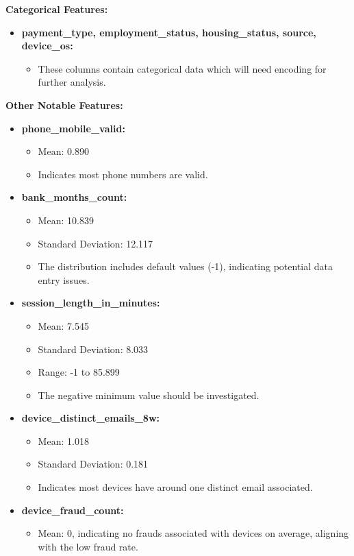 \documentclass[12pt,a4paper]{report}
\begin{document}
\textbf{Categorical Features:}
\begin{itemize}
    \item \textbf{payment\_type, employment\_status, housing\_status, source, device\_os:}
        \begin{itemize}
            \item These columns contain categorical data which will need encoding for further analysis.
        \end{itemize}
\end{itemize}

\textbf{Other Notable Features:}
\begin{itemize}
    \item \textbf{phone\_mobile\_valid:}
        \begin{itemize}
            \item Mean: 0.890
            \item Indicates most phone numbers are valid.
        \end{itemize}
    \item \textbf{bank\_months\_count:}
        \begin{itemize}
            \item Mean: 10.839
            \item Standard Deviation: 12.117
            \item The distribution includes default values (-1), indicating potential data entry issues.
        \end{itemize}
    \item \textbf{session\_length\_in\_minutes:}
        \begin{itemize}
            \item Mean: 7.545
            \item Standard Deviation: 8.033
            \item Range: -1 to 85.899
            \item The negative minimum value should be investigated.
        \end{itemize}
    \item \textbf{device\_distinct\_emails\_8w:}
        \begin{itemize}
            \item Mean: 1.018
            \item Standard Deviation: 0.181
            \item Indicates most devices have around one distinct email associated.
        \end{itemize}
    \item \textbf{device\_fraud\_count:}
        \begin{itemize}
            \item Mean: 0, indicating no frauds associated with devices on average, aligning with the low fraud rate.
        \end{itemize}
\end{itemize}
\end{document}
